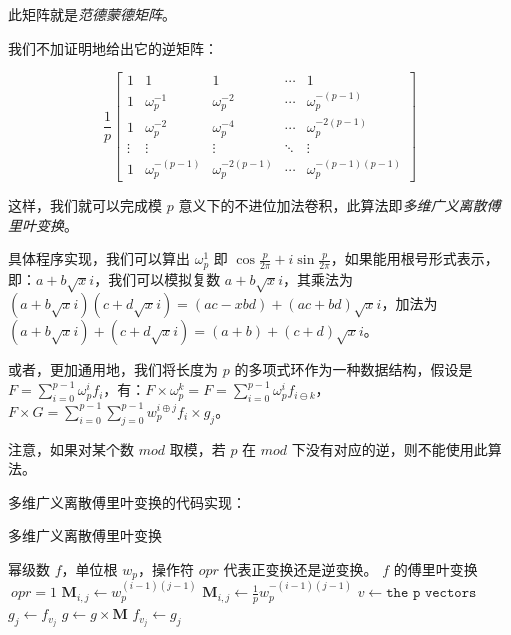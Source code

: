 \documentclass{article}
\begin{document}
此矩阵就是\textsl{范德蒙德矩阵}。

我们不加证明地给出它的逆矩阵：

$$
\frac 1 p \begin{bmatrix} 1& 1 & 1& \cdots & 1\\ 1& \omega_p^{-1}& \omega_p^{-2}& \cdots & \omega_p^{-(p - 1)}\\ 1& \omega_p^{-2} & \omega_p^{-4}& \cdots & \omega_p^{-2(p - 1)}\\ \vdots& \vdots& \vdots& \ddots& \vdots\\ 1& \omega_p^{-(p - 1)}& \omega_p^{-2(p - 1)} & \cdots & \omega_p^{-(p - 1)(p - 1)} \end{bmatrix}
$$

这样，我们就可以完成模 $p$ 意义下的不进位加法卷积，此算法即\textsl{多维广义离散傅里叶变换}。

具体程序实现，我们可以算出 $\omega_p^1$ 即 $\cos \frac{p}{2\pi} + i\sin \frac{p}{2\pi}$，如果能用根号形式表示，即：$a+b\sqrt{x}i$，我们可以模拟复数 $a+b\sqrt{x}i$，其乘法为 $(a+b\sqrt{x}i)(c+d\sqrt{x}i)=(ac-xbd)+(ac+bd)\sqrt{x}i$，加法为 $(a+b\sqrt xi)+(c+d\sqrt xi)=(a+b)+(c+d)\sqrt xi$。

或者，更加通用地，我们将长度为 $p$ 的多项式环作为一种数据结构，假设是 $F=\sum_{i=0}^{p-1} \omega_p^i f_i$，有：$F \times \omega_p^k=F=\sum_{i=0}^{p-1} \omega_p^i f_{i\ominus k}$，$F \times G=\sum_{i=0}^{p-1} \sum_{j=0}^{p-1} w_p^{i \oplus j} f_i \times g_j$。

注意，如果对某个数 $mod$ 取模，若 $p$ 在 $mod$ 下没有对应的逆，则不能使用此算法。

多维广义离散傅里叶变换的代码实现：

\begin{algorithm}
    \caption{多维广义离散傅里叶变换}
    \begin{algorithmic}[1]
        \Require 幂级数 $f$，单位根 $w_p$，操作符 $opr$ 代表正变换还是逆变换。
        \Ensure $f$ 的傅里叶变换
            \If $\ opr=1$
                \State $\textbf{M}_{i,j} \gets w^{(i-1)(j-1)}_p$
            \Else
                \State $\textbf{M}_{i,j} \gets \frac{1}{p}w^{-(i-1)(j-1)}_p$
            \EndIf
                    \State $v \gets \texttt{the p vectors}$
                        \State $g_j \gets f_{v_j}$
                    \EndFor
                    \State $g \gets g \times \textbf{M}$
                        \State $f_{v_j} \gets g_j$
                    \EndFor
                \EndFor
            \EndFor
            \State {}
        \EndFunction
    \end{algorithmic}
\end{algorithm}
\end{document}
